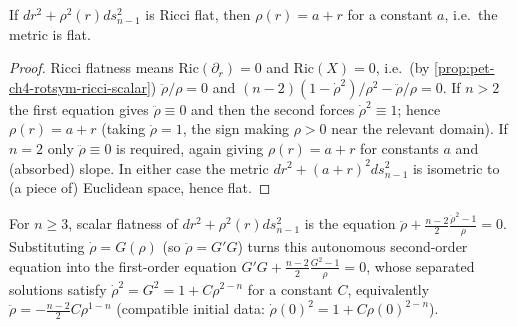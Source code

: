 \begin{proposition}
  \label{prop:pet-ch4-ricci-flat-rotsym}
  If $dr^2+\rho^2(r)ds_{n-1}^2$ is Ricci flat, then $\rho(r)=a+r$ for a constant
  $a$, i.e.\ the metric is flat.
\end{proposition}
\begin{proof}
  Ricci flatness means $\mathrm{Ric}(\partial_r)=0$ and $\mathrm{Ric}(X)=0$, i.e.\ (by
  \cref{prop:pet-ch4-rotsym-ricci-scalar}) $\ddot\rho/\rho=0$ and
  $(n-2)(1-\dot\rho^2)/\rho^2-\ddot\rho/\rho=0$. If $n>2$ the first equation
  gives $\ddot\rho\equiv0$ and then the second forces $\dot\rho^2\equiv1$; hence
  $\rho(r)=a+r$ (taking $\dot\rho=1$, the sign making $\rho>0$ near the relevant
  domain). If $n=2$ only $\ddot\rho\equiv0$ is required, again giving
  $\rho(r)=a+r$ for constants $a$ and (absorbed) slope. In either case the
  metric $dr^2+(a+r)^2ds_{n-1}^2$ is isometric to (a piece of) Euclidean space,
  hence flat.
\end{proof}

\begin{definition}
  \label{def:pet-ch4-scalar-flat-ode}
  \leanok
  For $n\ge3$, scalar flatness of $dr^2+\rho^2(r)ds_{n-1}^2$ is the equation
  $\ddot\rho+\tfrac{n-2}2\tfrac{\dot\rho^2-1}\rho=0$. Substituting $\dot\rho=G(\rho)$
  (so $\ddot\rho=G'G$) turns this autonomous second-order equation into the
  first-order equation $G'G+\tfrac{n-2}2\tfrac{G^2-1}\rho=0$, whose separated
  solutions satisfy $\dot\rho^2=G^2=1+C\rho^{2-n}$ for a constant $C$, equivalently
  $\ddot\rho=-\tfrac{n-2}2C\rho^{1-n}$ (compatible initial data:
  $\dot\rho(0)^2=1+C\rho(0)^{2-n}$).
\end{definition}


